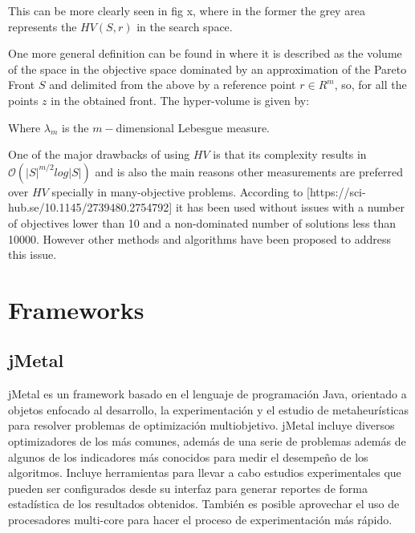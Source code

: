 This can be more clearly seen in fig x, where in the former the grey area represents the $HV(S,r)$ in the search space.


One more general definition can be found in %
where it is described as the volume of the space in the objective space dominated by an approximation of the Pareto Front $S$ and delimited from the above by a reference point $r \in R^{m} $, so, for all the points $z$ in the obtained front. The hyper-volume is given by:


Where $\lambda_m$ is the $m-$dimensional Lebesgue measure.

One of the major drawbacks of using $HV$ is that its complexity results in $\mathcal{O}(|S|^{m/2}log|S|)$ and is also the main reasons other measurements are preferred over $HV$ specially in many-objective problems. According to [https://sci-hub.se/10.1145/2739480.2754792] it has been used without issues with a number of objectives lower than 10 and a non-dominated number of solutions less than 10000. However other methods and algorithms have been proposed to address this issue.


\section{Frameworks}
\subsection{jMetal}

jMetal es un framework basado en el lenguaje de programación Java, orientado a objetos enfocado al desarrollo, la experimentación y el estudio de metaheurísticas para resolver problemas de optimización multiobjetivo. jMetal incluye diversos optimizadores de los más comunes, además de una serie de problemas además de algunos de los indicadores más conocidos para medir el desempeño de los algoritmos. Incluye herramientas para llevar a cabo estudios experimentales que pueden ser configurados desde su interfaz para generar reportes de forma estadística de los resultados obtenidos. También es posible  aprovechar el uso de procesadores multi-core para hacer el proceso de experimentación más rápido.\\

